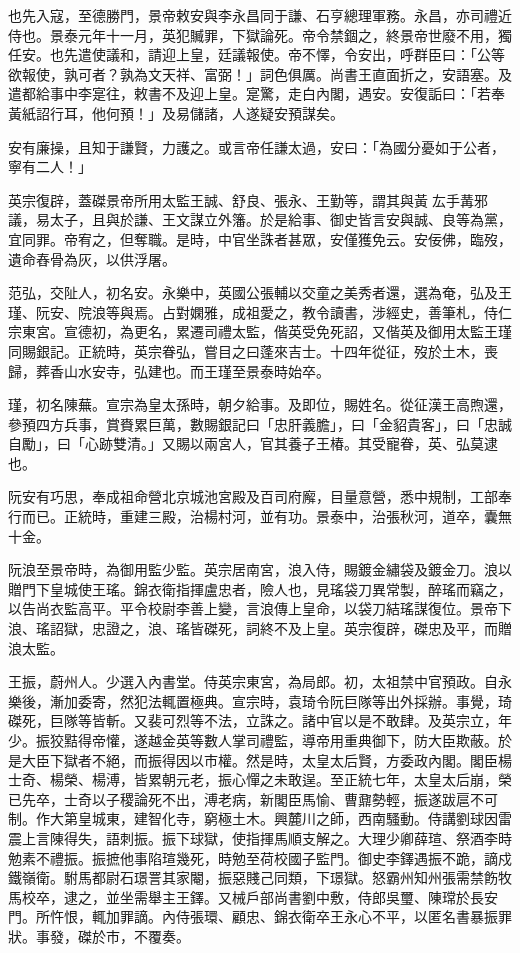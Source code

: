 \begin{pinyinscope}
也先入寇，至德勝門，景帝敕安與李永昌同于謙、石亨總理軍務。永昌，亦司禮近侍也。景泰元年十一月，英犯贓罪，下獄論死。帝令禁錮之，終景帝世廢不用，獨任安。也先遣使議和，請迎上皇，廷議報使。帝不懌，令安出，呼群臣曰：「公等欲報使，孰可者？孰為文天祥、富弼！」詞色俱厲。尚書王直面折之，安語塞。及遣都給事中李寔往，敕書不及迎上皇。寔驚，走白內閣，遇安。安復詬曰：「若奉黃紙詔行耳，他何預！」及易儲諸，人遂疑安預謀矣。

安有廉操，且知于謙賢，力護之。或言帝任謙太過，安曰：「為國分憂如于公者，寧有二人！」

英宗復辟，蓋磔景帝所用太監王誠、舒良、張永、王勤等，謂其與黃厷手冓邪議，易太子，且與於謙、王文謀立外籓。於是給事、御史皆言安與誠、良等為黨，宜同罪。帝宥之，但奪職。是時，中官坐誅者甚眾，安僅獲免云。安佞佛，臨歿，遺命舂骨為灰，以供浮屠。

范弘，交阯人，初名安。永樂中，英國公張輔以交童之美秀者還，選為奄，弘及王瑾、阮安、院浪等與焉。占對嫻雅，成祖愛之，教令讀書，涉經史，善筆札，侍仁宗東宮。宣德初，為更名，累遷司禮太監，偕英受免死詔，又偕英及御用太監王瑾同賜銀記。正統時，英宗眷弘，嘗目之曰蓬來吉士。十四年從征，歿於土木，喪歸，葬香山水安寺，弘建也。而王瑾至景泰時始卒。

瑾，初名陳蕪。宣宗為皇太孫時，朝夕給事。及即位，賜姓名。從征漢王高煦還，參預四方兵事，賞賚累巨萬，數賜銀記曰「忠肝義膽」，曰「金貂貴客」，曰「忠誠自勵」，曰「心跡雙清。」又賜以兩宮人，官其養子王椿。其受寵眷，英、弘莫逮也。

阮安有巧思，奉成祖命營北京城池宮殿及百司府廨，目量意營，悉中規制，工部奉行而已。正統時，重建三殿，治楊村河，並有功。景泰中，治張秋河，道卒，囊無十金。

阮浪至景帝時，為御用監少監。英宗居南宮，浪入侍，賜鍍金繡袋及鍍金刀。浪以贈門下皇城使王瑤。錦衣衛指揮盧忠者，險人也，見瑤袋刀異常製，醉瑤而竊之，以告尚衣監高平。平令校尉李善上變，言浪傳上皇命，以袋刀結瑤謀復位。景帝下浪、瑤詔獄，忠證之，浪、瑤皆磔死，詞終不及上皇。英宗復辟，磔忠及平，而贈浪太監。

王振，蔚州人。少選入內書堂。侍英宗東宮，為局郎。初，太祖禁中官預政。自永樂後，漸加委寄，然犯法輒置極典。宣宗時，袁琦令阮巨隊等出外採辦。事覺，琦磔死，巨隊等皆斬。又裴可烈等不法，立誅之。諸中官以是不敢肆。及英宗立，年少。振狡黠得帝懽，遂越金英等數人掌司禮監，導帝用重典御下，防大臣欺蔽。於是大臣下獄者不絕，而振得因以市權。然是時，太皇太后賢，方委政內閣。閣臣楊士奇、楊榮、楊溥，皆累朝元老，振心憚之未敢逞。至正統七年，太皇太后崩，榮已先卒，士奇以子稷論死不出，溥老病，新閣臣馬愉、曹鼐勢輕，振遂跋扈不可制。作大第皇城東，建智化寺，窮極土木。興麓川之師，西南騷動。侍講劉球因雷震上言陳得失，語刺振。振下球獄，使指揮馬順支解之。大理少卿薛瑄、祭酒李時勉素不禮振。振摭他事陷瑄幾死，時勉至荷校國子監門。御史李鐸遇振不跪，謫戍鐵嶺衛。駙馬都尉石璟詈其家閹，振惡賤己同類，下璟獄。怒霸州知州張需禁飭牧馬校卒，逮之，並坐需舉主王鐸。又械戶部尚書劉中敷，侍郎吳璽、陳瑺於長安門。所忤恨，輒加罪謫。內侍張環、顧忠、錦衣衛卒王永心不平，以匿名書暴振罪狀。事發，磔於市，不覆奏。


\end{pinyinscope}
